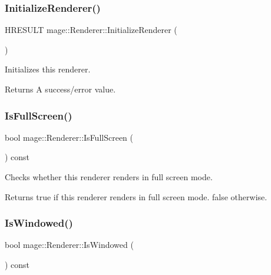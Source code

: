 \subsubsection{\texorpdfstring{Initialize\+Renderer()}{InitializeRenderer()}}
{\footnotesize\ttfamily H\+R\+E\+S\+U\+LT mage\+::\+Renderer\+::\+Initialize\+Renderer (\begin{DoxyParamCaption}{ }\end{DoxyParamCaption})\hspace{0.3cm}{\ttfamily [private]}}

Initializes this renderer.

\begin{DoxyReturn}{Returns}
A success/error value. 
\end{DoxyReturn}
\hypertarget{classmage_1_1_renderer_a5ae3220e19c68f47a8e4d55e3ced4694}{}\label{classmage_1_1_renderer_a5ae3220e19c68f47a8e4d55e3ced4694} 
\subsubsection{\texorpdfstring{Is\+Full\+Screen()}{IsFullScreen()}}
{\footnotesize\ttfamily bool mage\+::\+Renderer\+::\+Is\+Full\+Screen (\begin{DoxyParamCaption}{ }\end{DoxyParamCaption}) const}

Checks whether this renderer renders in full screen mode.

\begin{DoxyReturn}{Returns}
{\ttfamily true} if this renderer renders in full screen mode. {\ttfamily false} otherwise. 
\end{DoxyReturn}
\hypertarget{classmage_1_1_renderer_a1de1804c1eedae7dc12435a520a10b9c}{}\label{classmage_1_1_renderer_a1de1804c1eedae7dc12435a520a10b9c} 
\subsubsection{\texorpdfstring{Is\+Windowed()}{IsWindowed()}}
{\footnotesize\ttfamily bool mage\+::\+Renderer\+::\+Is\+Windowed (\begin{DoxyParamCaption}{ }\end{DoxyParamCaption}) const}

